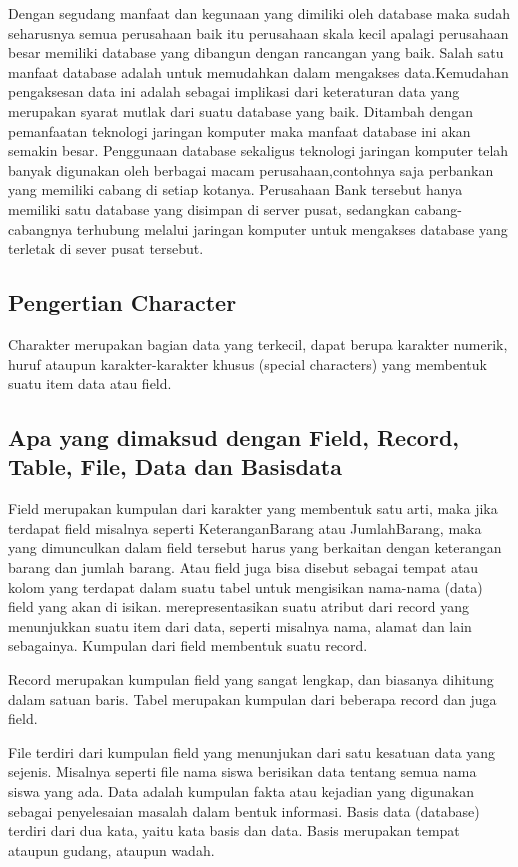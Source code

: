 	Dengan segudang manfaat dan kegunaan yang dimiliki oleh database maka sudah seharusnya semua perusahaan baik itu perusahaan skala kecil apalagi perusahaan besar memiliki database yang dibangun dengan rancangan yang baik. Salah satu manfaat database adalah untuk memudahkan dalam mengakses data.Kemudahan pengaksesan data ini adalah sebagai implikasi dari keteraturan data yang
merupakan syarat mutlak dari suatu database yang baik. Ditambah dengan pemanfaatan teknologi jaringan komputer maka manfaat database ini akan semakin besar. Penggunaan database sekaligus teknologi jaringan komputer telah banyak digunakan oleh berbagai macam perusahaan,contohnya saja perbankan yang memiliki cabang di setiap kotanya. Perusahaan Bank tersebut hanya memiliki satu database yang disimpan di server pusat, sedangkan cabang-cabangnya terhubung melalui jaringan komputer untuk mengakses database yang terletak di sever pusat tersebut.


\subsection {Pengertian Character}
	Charakter merupakan bagian data yang terkecil, dapat berupa karakter numerik, huruf ataupun karakter-karakter khusus (special characters) yang membentuk suatu item data atau field.

\subsection {Apa yang dimaksud dengan Field, Record, Table, File, Data dan Basisdata} 
	Field merupakan kumpulan dari karakter yang membentuk satu arti, maka jika terdapat field misalnya seperti KeteranganBarang atau JumlahBarang, maka yang dimunculkan dalam field tersebut harus yang berkaitan dengan keterangan barang dan jumlah barang. Atau field juga bisa disebut sebagai tempat atau kolom yang terdapat dalam suatu tabel untuk mengisikan nama-nama (data) field yang akan di isikan. merepresentasikan suatu atribut dari record yang menunjukkan suatu item dari data, seperti misalnya nama, alamat dan lain sebagainya. Kumpulan dari field membentuk suatu record.

	Record merupakan kumpulan field yang sangat lengkap, dan biasanya dihitung dalam satuan baris. Tabel merupakan kumpulan dari beberapa record dan juga field. 
	
	File terdiri dari kumpulan field yang menunjukan dari satu kesatuan data yang sejenis. Misalnya seperti file nama siswa berisikan data tentang semua nama siswa yang ada. Data adalah kumpulan fakta atau kejadian yang digunakan sebagai penyelesaian masalah dalam bentuk informasi. Basis data (database) terdiri dari dua kata, yaitu kata basis dan data. Basis merupakan tempat ataupun gudang, ataupun wadah.

